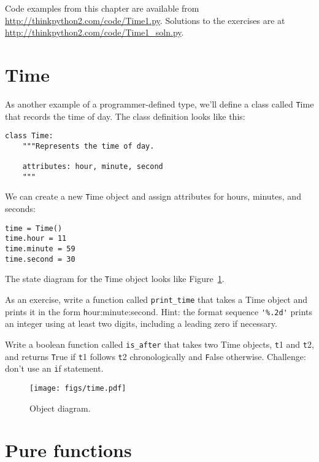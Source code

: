 \documentclass[
DIV=11,
fontsize=13,
twoside,
headinclude=false,
titlepage=firstiscover,
abstract=true,
headsepline=true,
footsepline=true,
chapterprefix=true, %
headings=big,
bibliography=totoc,%
captions=tableheading
]{scrbook}
\theoremstyle{definition}
\begin{document}
Code examples from this chapter are available from
\url{http://thinkpython2.com/code/Time1.py}.
Solutions to the exercises are at
\url{http://thinkpython2.com/code/Time1_soln.py}.


\section{Time}
\label{isafter}

As another example of a programmer-defined type, we'll define a class
called {\texttt Time} that records the time of day.  The class definition
looks like this: 
  

\begin{lstlisting}
class Time:
    """Represents the time of day.
       
    attributes: hour, minute, second
    """
\end{lstlisting}
%
We can create a new {\texttt Time} object and assign
attributes for hours, minutes, and seconds:

\begin{lstlisting}
time = Time()
time.hour = 11
time.minute = 59
time.second = 30
\end{lstlisting}
%
The state diagram for the {\texttt Time} object looks like Figure~\ref{fig.time}.

As an exercise, write a function called \verb"print_time" that takes a 
Time object and prints it in the form {\texttt hour:minute:second}.
Hint: the format sequence \verb"'%.2d'" prints an integer using
at least two digits, including a leading zero if necessary.

Write a boolean function called \verb"is_after" that
takes two Time objects, {\texttt t1} and {\texttt t2}, and
returns {\texttt True} if {\texttt t1} follows {\texttt t2} chronologically and
{\texttt False} otherwise.  Challenge: don't use an {\texttt if} statement.

\begin{figure}
\centerline
{\texttt{[image: figs/time.pdf]}}
\caption{Object diagram.}
\label{fig.time}
\end{figure}


\section{Pure functions}
\end{document}
